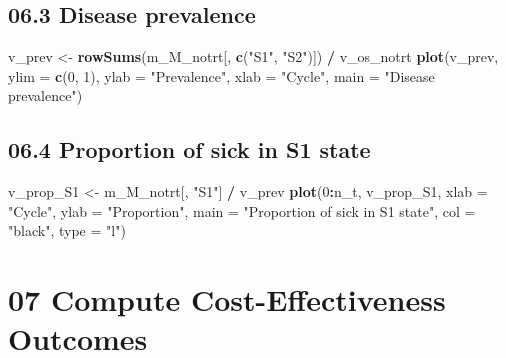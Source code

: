 \documentclass[
]{article}
\newenvironment{Shaded}{\begin{snugshade}}{\end{snugshade}}
\newcommand{\DataTypeTok}[1]{\textcolor[rgb]{0.13,0.29,0.53}{#1}}
\newcommand{\DecValTok}[1]{\textcolor[rgb]{0.00,0.00,0.81}{#1}}
\newcommand{\KeywordTok}[1]{\textcolor[rgb]{0.13,0.29,0.53}{\textbf{#1}}}
\newcommand{\NormalTok}[1]{#1}
\newcommand{\OperatorTok}[1]{\textcolor[rgb]{0.81,0.36,0.00}{\textbf{#1}}}
\newcommand{\StringTok}[1]{\textcolor[rgb]{0.31,0.60,0.02}{#1}}
\begin{document}
\hypertarget{disease-prevalence}{%
\subsection{06.3 Disease prevalence}\label{disease-prevalence}}

\begin{Shaded}
\begin{Highlighting}[]
\NormalTok{v_prev <-}\StringTok{ }\KeywordTok{rowSums}\NormalTok{(m_M_notrt[, }\KeywordTok{c}\NormalTok{(}\StringTok{"S1"}\NormalTok{, }\StringTok{"S2"}\NormalTok{)]) }\OperatorTok{/}\StringTok{ }\NormalTok{v_os_notrt}
\KeywordTok{plot}\NormalTok{(v_prev,}
     \DataTypeTok{ylim =} \KeywordTok{c}\NormalTok{(}\DecValTok{0}\NormalTok{, }\DecValTok{1}\NormalTok{),}
     \DataTypeTok{ylab =} \StringTok{"Prevalence"}\NormalTok{,}
     \DataTypeTok{xlab =} \StringTok{"Cycle"}\NormalTok{,}
     \DataTypeTok{main =} \StringTok{"Disease prevalence"}\NormalTok{)}
\end{Highlighting}
\end{Shaded}

\hypertarget{proportion-of-sick-in-s1-state}{%
\subsection{06.4 Proportion of sick in S1
state}\label{proportion-of-sick-in-s1-state}}

\begin{Shaded}
\begin{Highlighting}[]
\NormalTok{v_prop_S1 <-}\StringTok{ }\NormalTok{m_M_notrt[, }\StringTok{"S1"}\NormalTok{] }\OperatorTok{/}\StringTok{ }\NormalTok{v_prev}
\KeywordTok{plot}\NormalTok{(}\DecValTok{0}\OperatorTok{:}\NormalTok{n_t, v_prop_S1,}
     \DataTypeTok{xlab =} \StringTok{"Cycle"}\NormalTok{, }
     \DataTypeTok{ylab =} \StringTok{"Proportion"}\NormalTok{, }
     \DataTypeTok{main =} \StringTok{"Proportion of sick in S1 state"}\NormalTok{, }
     \DataTypeTok{col  =} \StringTok{"black"}\NormalTok{, }\DataTypeTok{type =} \StringTok{"l"}\NormalTok{)}
\end{Highlighting}
\end{Shaded}

\hypertarget{compute-cost-effectiveness-outcomes}{%
\section{07 Compute Cost-Effectiveness
Outcomes}\label{compute-cost-effectiveness-outcomes}}
\end{document}
